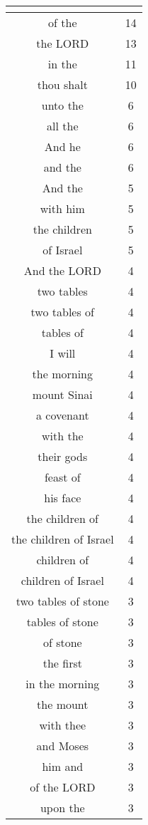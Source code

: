 \begin{center}
\begin{longtable}{|c|c|}
\hline \multicolumn{2}{c}{{ }} \\ \hline
\endfoot 
of the & 14\\ \hline 
the LORD & 13\\ \hline 
in the & 11\\ \hline 
thou shalt & 10\\ \hline 
unto the & 6\\ \hline 
all the & 6\\ \hline 
And he & 6\\ \hline 
and the & 6\\ \hline 
And the & 5\\ \hline 
with him & 5\\ \hline 
the children & 5\\ \hline 
of Israel & 5\\ \hline 
And the LORD & 4\\ \hline 
two tables & 4\\ \hline 
two tables of & 4\\ \hline 
tables of & 4\\ \hline 
I will & 4\\ \hline 
the morning & 4\\ \hline 
mount Sinai & 4\\ \hline 
a covenant & 4\\ \hline 
with the & 4\\ \hline 
their gods & 4\\ \hline 
feast of & 4\\ \hline 
his face & 4\\ \hline 
the children of & 4\\ \hline 
the children of Israel & 4\\ \hline 
children of & 4\\ \hline 
children of Israel & 4\\ \hline 
two tables of stone & 3\\ \hline 
tables of stone & 3\\ \hline 
of stone & 3\\ \hline 
the first & 3\\ \hline 
in the morning & 3\\ \hline 
the mount & 3\\ \hline 
with thee & 3\\ \hline 
and Moses & 3\\ \hline 
him and & 3\\ \hline 
of the LORD & 3\\ \hline 
upon the & 3\\ \hline 

\end{longtable}
\end{center}
